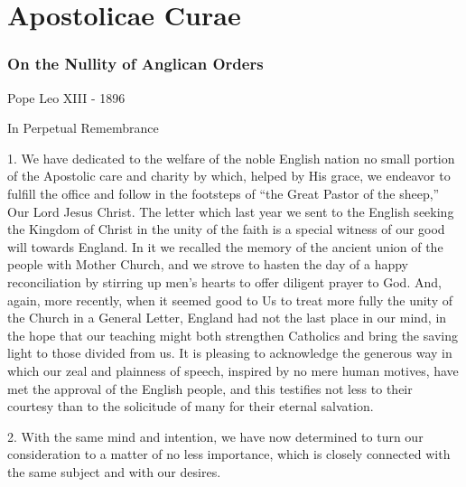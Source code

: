 \section{Apostolicae Curae}\label{apostolicae-curae}

\subsubsection{On the Nullity of Anglican
Orders}\label{on-the-nullity-of-anglican-orders}

Pope Leo XIII - 1896

In Perpetual Remembrance

1. We have dedicated to the welfare of the noble English nation no small
portion of the Apostolic care and charity by which, helped by His grace,
we endeavor to fulfill the office and follow in the footsteps of ``the
Great Pastor of the sheep,'' Our Lord Jesus Christ. The letter which
last year we sent to the English seeking the Kingdom of Christ in the
unity of the faith is a special witness of our good will towards
England. In it we recalled the memory of the ancient union of the people
with Mother Church, and we strove to hasten the day of a happy
reconciliation by stirring up men's hearts to offer diligent prayer to
God. And, again, more recently, when it seemed good to Us to treat more
fully the unity of the Church in a General Letter, England had not the
last place in our mind, in the hope that our teaching might both
strengthen Catholics and bring the saving light to those divided from
us. It is pleasing to acknowledge the generous way in which our zeal and
plainness of speech, inspired by no mere human motives, have met the
approval of the English people, and this testifies not less to their
courtesy than to the solicitude of many for their eternal salvation.

2. With the same mind and intention, we have now determined to turn our
consideration to a matter of no less importance, which is closely
connected with the same subject and with our desires.


